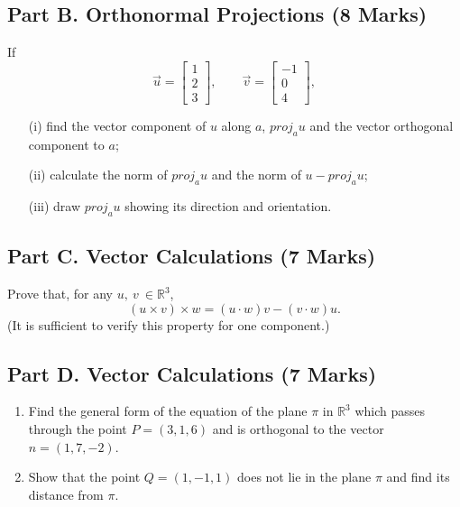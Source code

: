 \documentclass[a4paper,12pt]{article}
\begin{document}
	
	\subsection*{Part B. Orthonormal Projections (8 Marks)}
	If
	\begin{equation*}
	\vec{u}=\left[ \begin{array}{c} 1 \\ 2 \\ 3 \end{array}\right],\qquad 
	\vec{v}=\left[ \begin{array}{c} -1 \\ 0 \\ 4 \end{array}\right],
	\end{equation*}
	
\begin{itemize}
	\item[(i)]  find the vector component of $u$ along $a$, $proj_{a}u$ and the
	vector orthogonal component to $a$;
	
	\item[(ii)]   calculate the norm of $proj_a u$ and the norm of $u-proj_a u$;
	
	\item[(iii)]   draw $proj_a u$ showing its direction and orientation.
		\end{itemize}
	\subsection*{Part C. Vector Calculations (7 Marks)}		
 Prove that, for any $u,\:v\:\in\mathbb{R}^3$, %
			$$(u\times v)\times w= (u\cdot w)v - (v\cdot w)u.$$
			(It is sufficient to verify this property for one component.)

	\subsection*{Part D. Vector Calculations (7 Marks)}
			\begin{enumerate}
				\item Find the general form of the equation of the plane $\pi$ in $\mathbb{R}^3$ which passes through the point 
				$P=(3,1,6)$ and is orthogonal to the vector $n=(1,7,-2)$. %
				
				\item Show that the point $Q=(1,-1,1)$ does not lie in the plane $\pi$ and find its distance from $\pi$. %
			\end{enumerate}
\end{document}
